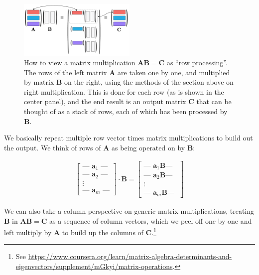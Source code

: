 \begin{figure}[h]
\centering
\includegraphics[width=0.5\textwidth]{images/rowPerspective.png}
\caption[Jeff Yoshimi.]{How to view a matrix multiplication  $\mathbf{A}\mathbf{B} = \mathbf{C}$ as ``row processing''.  The rows of the left matrix $\mathbf{A}$ are taken one by one, and multiplied by matrix $\mathbf{B}$  on the right, using the methods of the section above on right multiplication.  This is done for each row (as is shown in the center panel), and the end result is an output matrix $\mathbf{C}$ that can be thought of as a stack of rows, each of which has been processed by $\mathbf{B}$.}
\label{rowPerspective}
\end{figure} 

We basically repeat multiple row vector times matrix multiplications to build out the output. We think of rows of $\mathbf{A}$ as being operated on by $\mathbf{B}$:

\begin{align*}
\begin{bmatrix}
\text{--- } \mathbf{a}_1 \text{ ---} \\
\text{--- } \mathbf{a}_2 \text{ ---} \\
\vdots \\
\text{--- } \mathbf{a}_m \text{ ---}
\end{bmatrix}
\cdot
\mathbf{B}
=
\begin{bmatrix}
\text{--- } \mathbf{a}_1 \mathbf{B} \text{--- } \\
\text{--- } \mathbf{a}_2 \mathbf{B} \text{--- } \\
\vdots \\
\text{--- } \mathbf{a}_m \mathbf{B} \text{--- }
\end{bmatrix}
\end{align*}

We can also take a column perspective on generic matrix multiplications, treating $\mathbf{B}$ in $\mathbf{A}\mathbf{B} = \mathbf{C}$ as a sequence of column vectors, which we peel off one by one and left multiply by $\mathbf{A}$ to build up the columns of $\mathbf{C}$.\footnote{See \url{https://www.coursera.org/learn/matrix-algebra-determinants-and-eigenvectors/supplement/mGkyi/matrix-operations}.} 

